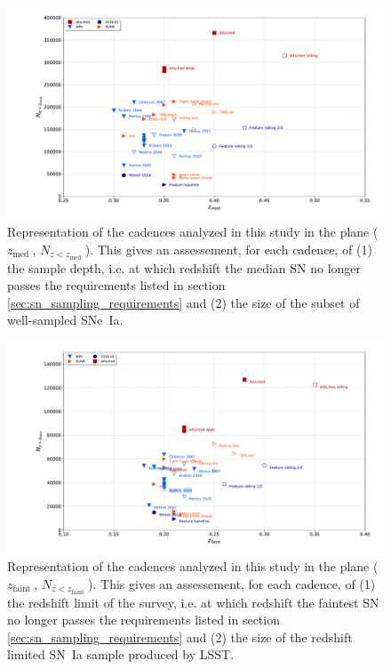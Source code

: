 \documentclass [11pt,a4paper]{article}
\newcommand{\zfaint}{$z_{\mathrm{faint}}\ $}
\newcommand{\nsnfaint}{$N_{z<z_{\mathrm{faint}}}\ $}
\newcommand{\zmed}{$z_{\mathrm{med}}\ $}
\newcommand{\nsnmed}{$N_{z<z_{\mathrm{med}}}\ $}
\begin{document}
\begin{figure}
  \begin{center}
    \includegraphics[width=\linewidth]{Figures/summary_plot_wfd_mediansn.pdf}
    \caption{Representation of the cadences analyzed in this study in
      the plane (\zmed, \nsnmed). This gives an assessement, for each
      cadence, of (1) the sample depth, i.e. at which redshift the
      median SN no longer passes the requirements listed in section
      \ref{sec:sn_sampling_requirements} and (2) the size of the
      subset of well-sampled SNe~Ia.}
  \end{center}
\end{figure}


\begin{figure}
  \begin{center}
    \includegraphics[width=\linewidth]{Figures/summary_plot_wfd_faintsn.pdf}
    \caption{Representation of the cadences analyzed in this study in
      the plane (\zfaint, \nsnfaint). This gives an assessement, for
      each cadence, of (1) the redshift limit of the survey, i.e. at
      which redshift the faintest SN no longer passes the requirements
      listed in section \ref{sec:sn_sampling_requirements} and (2) the
      size of the redshift limited SN~Ia sample produced by LSST.}
  \end{center}
\end{figure}
\end{document}
